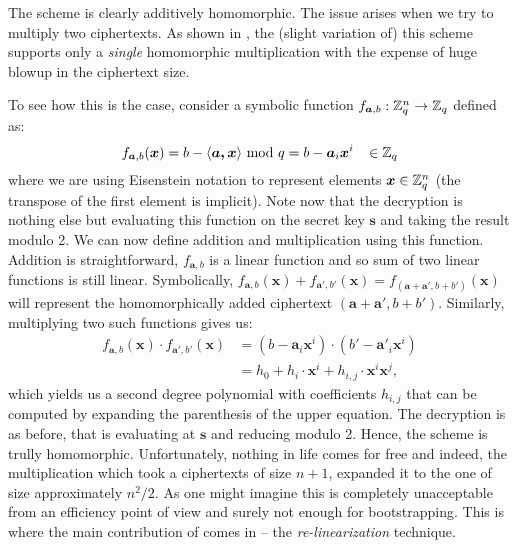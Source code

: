 The scheme is clearly additively homomorphic. The issue arises when we try to multiply two ciphertexts. As shown in \cite{one-mult}, the (slight variation of) this scheme supports only a \textit{single} homomorphic multiplication with the expense of huge blowup in the ciphertext size.

To see how this is the case, consider a symbolic function $f_{\boldsymbol{a},b} : \mathbb{Z}_q^n \rightarrow \mathbb{Z}_q$ defined as:
\[f_{\boldsymbol{a}, b}(\boldsymbol{x}) = b - \langle \boldsymbol{a, x} \rangle \text{ mod } q = b - \boldsymbol{a}_i \boldsymbol{x}^i \; \; \; \in \mathbb{Z}_q \]
where we are using Eisenstein notation to represent elements $\boldsymbol{x} \in \mathbb{Z}_q^n$ (the transpose of the first element is implicit). Note now that the decryption is nothing else but evaluating this function on the secret key $\bm{s}$ and taking the result modulo 2. We can now define addition and multiplication using this function. Addition is straightforward, $f_{\bm{a}, b}$ is a linear function and so sum of two linear functions is still linear. Symbolically, $f_{\bm{a},b}(\bm{x}) + f_{\bm{a}',b'}(\bm{x}) = f_{(\bm{a}+\bm{a}',b+b')}(\bm{x})$ will represent the homomorphically added ciphertext $(\bm{a}+\bm{a}',b+b')$. Similarly, multiplying two such functions gives us:
\begin{equation}\label{mult}
  \begin{split}
  f_{\bm{a},b}(\bm{x}) \cdot f_{\bm{a}',b'}(\bm{x}) & = ( b - \bm{a}_i \bm{x}^i) \cdot ( b' - \bm{a}'_i \bm{x}^i ) \\
						    & = h_0 + h_i \cdot \bm{x}^i + h_{i,j} \cdot \bm{x}^i \bm{x}^j,
\end{split}
\end{equation}
which yields us a second degree polynomial with coefficients $h_{i,j}$ that can be computed by expanding the parenthesis of the upper equation. The decryption is as before, that is evaluating at $\bm{s}$ and reducing modulo 2. Hence, the scheme is trully homomorphic. Unfortunately, nothing in life comes for free and indeed, the multiplication which took a ciphertexts of size $n+1$, expanded it to the one of size approximately $n^2/2$. As one might imagine this is completely unacceptable from an efficiency point of view and surely not enough for bootstrapping. This is where the main contribution of \cite{fhe-lwe} comes in -- the \textit{re-linearization} technique.
